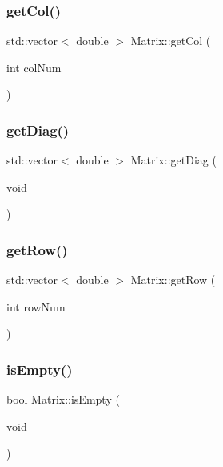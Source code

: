 \subsubsection{\texorpdfstring{get\+Col()}{getCol()}}
{\footnotesize\ttfamily std\+::vector$<$ double $>$ Matrix\+::get\+Col (\begin{DoxyParamCaption}\item[{int}]{col\+Num }\end{DoxyParamCaption})}

\mbox{\label{class_matrix_adc0504b22f3d95218b5e754890f0db3e}} 
\subsubsection{\texorpdfstring{get\+Diag()}{getDiag()}}
{\footnotesize\ttfamily std\+::vector$<$ double $>$ Matrix\+::get\+Diag (\begin{DoxyParamCaption}\item[{void}]{ }\end{DoxyParamCaption})}

\mbox{\label{class_matrix_a81f93e482ceaca5d013ab34b64ee3eb4}} 
\subsubsection{\texorpdfstring{get\+Row()}{getRow()}}
{\footnotesize\ttfamily std\+::vector$<$ double $>$ Matrix\+::get\+Row (\begin{DoxyParamCaption}\item[{int}]{row\+Num }\end{DoxyParamCaption})}

\mbox{\label{class_matrix_a8001c85cc9d6a706e659f972ea35ff93}} 
\subsubsection{\texorpdfstring{is\+Empty()}{isEmpty()}}
{\footnotesize\ttfamily bool Matrix\+::is\+Empty (\begin{DoxyParamCaption}\item[{void}]{ }\end{DoxyParamCaption})}

